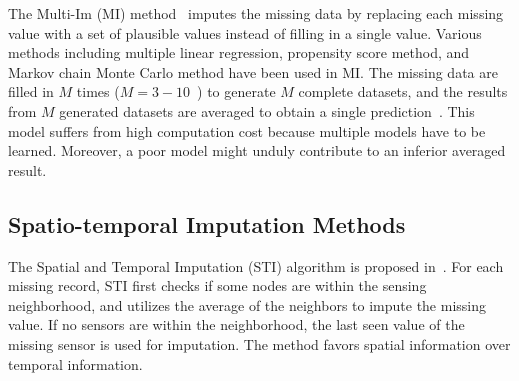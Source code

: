 The Multi-Im (MI) method~\cite{yuan2000multiple} imputes the missing data by replacing each missing value with a set of plausible values instead of filling in a single value. Various methods including multiple linear regression, propensity score method, and Markov chain Monte Carlo method have been used in MI. The missing data are filled in $M$ times ($M=3-10$~\cite{Little:hotdeck}) 
to generate $M$ complete datasets, and the results from $M$ generated datasets are averaged to obtain a single prediction~\cite{yuan2000multiple}. 
This model suffers from high computation cost because multiple models have to be learned. Moreover, a poor model might unduly 
contribute to an inferior averaged result. 



\subsection{Spatio-temporal Imputation Methods}



The Spatial and Temporal Imputation (STI) algorithm is proposed in~\cite{li2008spatial}. 
For each missing record, STI first checks if some nodes are within the sensing neighborhood, and utilizes
the average of the neighbors to impute the missing value. If no sensors are within the neighborhood, the last seen value of the 
missing sensor is used for imputation. The method favors spatial information over temporal information.

